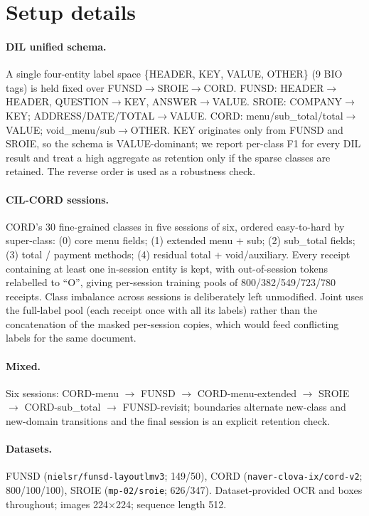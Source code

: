\documentclass{article}
\begin{document}
\appendix
\section{Setup details}
\label{app:setup}

\paragraph{DIL unified schema.} A single four-entity label space \{HEADER, KEY, VALUE, OTHER\} (9 BIO tags) is held fixed over FUNSD$\rightarrow$SROIE$\rightarrow$CORD. FUNSD: HEADER$\rightarrow$HEADER, QUESTION$\rightarrow$KEY, ANSWER$\rightarrow$VALUE. SROIE: COMPANY$\rightarrow$KEY; ADDRESS/DATE/TOTAL$\rightarrow$VALUE. CORD: menu/sub\_total/total$\rightarrow$VALUE; void\_menu/sub$\rightarrow$OTHER. KEY originates only from FUNSD and SROIE, so the schema is VALUE-dominant; we report per-class F1 for every DIL result and treat a high aggregate as retention only if the sparse classes are retained. The reverse order is used as a robustness check.

\paragraph{CIL-CORD sessions.} CORD's 30 fine-grained classes in five sessions of six, ordered easy-to-hard by super-class: (0) core menu fields; (1) extended menu + sub; (2) sub\_total fields; (3) total / payment methods; (4) residual total + void/auxiliary. Every receipt containing at least one in-session entity is kept, with out-of-session tokens relabelled to ``O'', giving per-session training pools of 800/382/549/723/780 receipts. Class imbalance across sessions is deliberately left unmodified. Joint uses the full-label pool (each receipt once with all its labels) rather than the concatenation of the masked per-session copies, which would feed conflicting labels for the same document.

\paragraph{Mixed.} Six sessions: CORD-menu $\rightarrow$ FUNSD $\rightarrow$ CORD-menu-extended $\rightarrow$ SROIE $\rightarrow$ CORD-sub\_total $\rightarrow$ FUNSD-revisit; boundaries alternate new-class and new-domain transitions and the final session is an explicit retention check.

\paragraph{Datasets.} FUNSD (\texttt{nielsr/funsd-layoutlmv3}; 149/50), CORD (\texttt{naver-clova-ix/cord-v2}; 800/100/100), SROIE (\texttt{mp-02/sroie}; 626/347). Dataset-provided OCR and boxes throughout; images 224$\times$224; sequence length 512.
\end{document}
